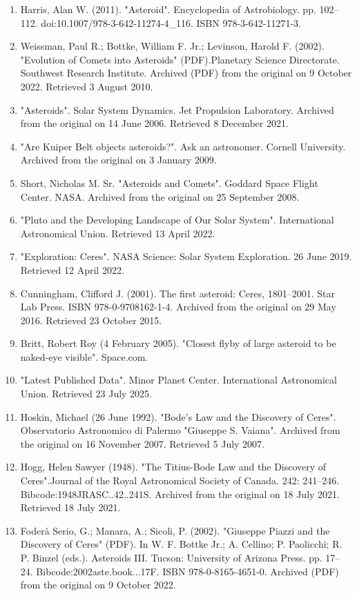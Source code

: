 \begin{enumerate}
\item Harris, Alan W. (2011). "Asteroid". Encyclopedia of Astrobiology. pp. 102–112. doi:10.1007/978-3-642-11274-4_116. ISBN 978-3-642-11271-3.
\item Weissman, Paul R.; Bottke, William F. Jr.; Levinson, Harold F. (2002). "Evolution of Comets into Asteroids" (PDF).Planetary Science Directorate. Southwest Research Institute. Archived (PDF) from the original on 9 October 2022. Retrieved 3 August 2010.
\item "Asteroids". Solar System Dynamics. Jet Propulsion Laboratory. Archived from the original on 14 June 2006. Retrieved 8 December 2021.
\item "Are Kuiper Belt objects asteroids?". Ask an astronomer. Cornell University. Archived from the original on 3 January 2009.
\item Short, Nicholas M. Sr. "Asteroids and Comets". Goddard Space Flight Center. NASA. Archived from the original on 25 September 2008.
\item "Pluto and the Developing Landscape of Our Solar System". International Astronomical Union. Retrieved 13 April 2022.
\item "Exploration: Ceres". NASA Science: Solar System Exploration. 26 June 2019. Retrieved 12 April 2022.
\item Cunningham, Clifford J. (2001). The first asteroid: Ceres, 1801–2001. Star Lab Press. ISBN 978-0-9708162-1-4. Archived from the original on 29 May 2016. Retrieved 23 October 2015.
\item Britt, Robert Roy (4 February 2005). "Closest flyby of large asteroid to be naked-eye visible". Space.com.
\item "Latest Published Data". Minor Planet Center. International Astronomical Union. Retrieved 23 July 2025.
\item Hoskin, Michael (26 June 1992). "Bode's Law and the Discovery of Ceres". Observatorio Astronomico di Palermo "Giuseppe S. Vaiana". Archived from the original on 16 November 2007. Retrieved 5 July 2007.
\item Hogg, Helen Sawyer (1948). "The Titius-Bode Law and the Discovery of Ceres".Journal of the Royal Astronomical Society of Canada. 242: 241–246. Bibcode:1948JRASC..42..241S. Archived from the original on 18 July 2021. Retrieved 18 July 2021.
\item Foderà Serio, G.; Manara, A.; Sicoli, P. (2002). "Giuseppe Piazzi and the Discovery of Ceres" (PDF). In W. F. Bottke Jr.; A. Cellino; P. Paolicchi; R. P. Binzel (eds.). Asteroids III. Tucson: University of Arizona Press. pp. 17–24. Bibcode:2002aste.book...17F. ISBN 978-0-8165-4651-0. Archived (PDF) from the original on 9 October 2022.

\end{enumerate}
